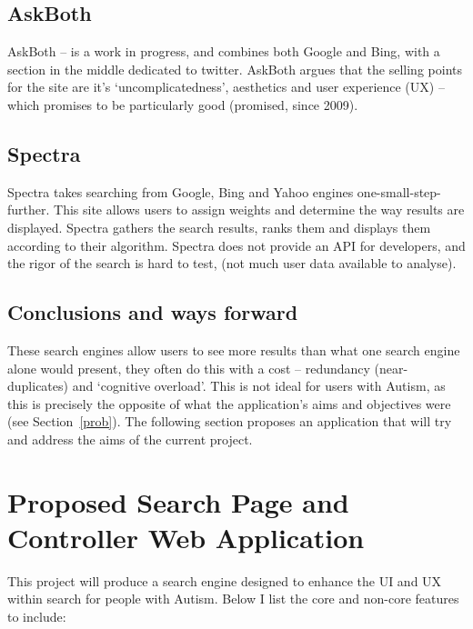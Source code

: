 \documentclass[10pt]{article}
\begin{document}
\subsection{AskBoth}
AskBoth – is a work in progress, and combines both Google and Bing, with a section in the middle dedicated to twitter. AskBoth argues that the selling points for the site are it’s ‘uncomplicatedness’, aesthetics and user experience (UX) – which promises to be particularly good (promised, since 2009).

\subsection{Spectra}
Spectra takes searching from Google, Bing and Yahoo engines one-small-step-further. This site allows users to assign weights and determine the way results are displayed. Spectra gathers the search results, ranks them and displays them according to their algorithm. Spectra does not provide an API for developers, and the rigor of the search is hard to test, (not much user data available to analyse).

\subsection{Conclusions and ways forward}
These search engines allow users to see more results than what one search engine alone would present, they often do this with a cost -- redundancy (near-duplicates) and ‘cognitive overload’. This is not ideal for users with Autism, as this is precisely the opposite of what the application's aims and objectives were (see Section~\ref{prob}).
The following section proposes an application that will try and address the aims of the current project.


\section{Proposed Search Page and Controller Web Application}\label{proposed}
This project will produce a search engine designed to enhance the UI and UX within search for people with Autism. Below I list the core and non-core features to include:
\end{document}
